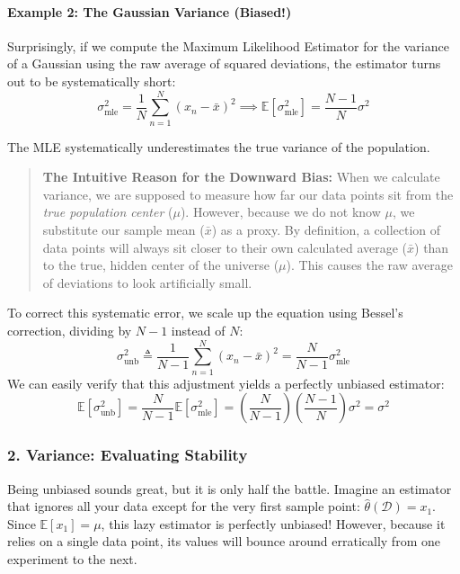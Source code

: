 \documentclass{article}
\begin{document}
\paragraph{Example 2: The Gaussian Variance (Biased!)}
Surprisingly, if we compute the Maximum Likelihood Estimator for the variance of a Gaussian using the raw average of squared deviations, the estimator turns out to be systematically short:
\begin{equation}
\sigma^2_{\text{mle}} = \frac{1}{N}\sum_{n=1}^{N}(x_n - \bar{x})^2 \implies \mathbb{E}\left[\sigma^2_{\text{mle}}\right] = \frac{N - 1}{N}\sigma^2
\end{equation}

The MLE systematically underestimates the true variance of the population. 

\begin{quotation}
\textbf{The Intuitive Reason for the Downward Bias:}
When we calculate variance, we are supposed to measure how far our data points sit from the \textit{true population center} ($\mu$). However, because we do not know $\mu$, we substitute our sample mean ($\bar{x}$) as a proxy. By definition, a collection of data points will always sit closer to their own calculated average ($\bar{x}$) than to the true, hidden center of the universe ($\mu$). This causes the raw average of deviations to look artificially small. 
\end{quotation}

To correct this systematic error, we scale up the equation using Bessel's correction, dividing by $N-1$ instead of $N$:
\begin{equation}
\sigma^2_{\text{unb}} \triangleq \frac{1}{N - 1}\sum_{n=1}^{N}(x_n - \bar{x})^2 = \frac{N}{N - 1}\sigma^2_{\text{mle}}
\end{equation}
We can easily verify that this adjustment yields a perfectly unbiased estimator:
\begin{equation}
\mathbb{E}\left[\sigma^2_{\text{unb}}\right] = \frac{N}{N - 1}\mathbb{E}\left[\sigma^2_{\text{mle}}\right] = \left(\frac{N}{N - 1}\right)\left(\frac{N - 1}{N}\right)\sigma^2 = \sigma^2
\end{equation}

\subsubsection{2. Variance: Evaluating Stability}
Being unbiased sounds great, but it is only half the battle. Imagine an estimator that ignores all your data except for the very first sample point: $\hat{\theta}(\mathcal{D}) = x_1$. Since $\mathbb{E}[x_1] = \mu$, this lazy estimator is perfectly unbiased! However, because it relies on a single data point, its values will bounce around erratically from one experiment to the next.
\end{document}
